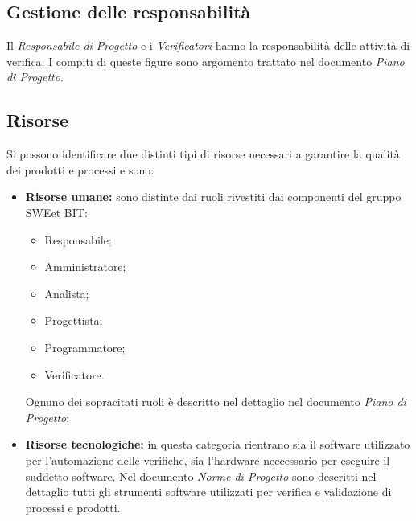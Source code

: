   \subsection{Gestione delle responsabilità}
    Il \emph{Responsabile di Progetto} e i \emph{Verificatori} hanno la responsabilità delle attività di verifica.
    I compiti di queste figure sono argomento trattato nel documento \emph{Piano di Progetto}.

  \subsection{Risorse}
    Si possono identificare due distinti tipi di risorse necessari a garantire la qualità dei prodotti e processi e sono:
    \begin{itemize}
      \item \textbf{Risorse umane:} sono distinte dai ruoli rivestiti dai componenti del gruppo SWEet BIT:
      \begin{itemize}
        \item Responsabile;
        \item Amministratore;
        \item Analista;
        \item Progettista;
        \item Programmatore;
        \item Verificatore.
      \end{itemize}
      Ognuno dei sopracitati ruoli è descritto nel dettaglio nel documento \emph{Piano di Progetto};
      \item \textbf{Risorse tecnologiche:} in questa categoria rientrano sia il software utilizzato per l'automazione delle verifiche,
      sia l'hardware neccessario per eseguire il suddetto software. Nel documento \emph{Norme di Progetto} sono descritti nel dettaglio
      tutti gli strumenti software utilizzati per verifica e validazione di processi e prodotti.
    \end{itemize}
